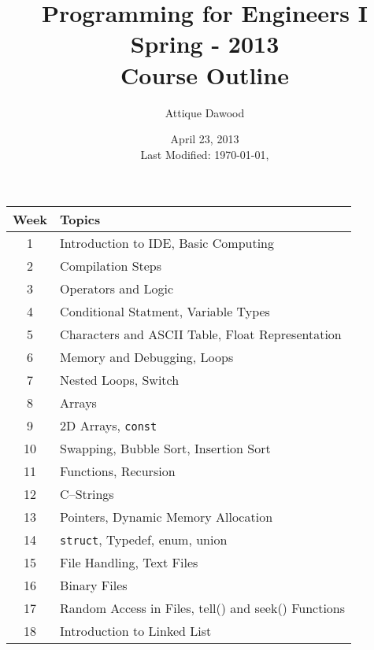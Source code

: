 \documentclass[12pt,a4paper]{article}
\title{\vspace{-2cm}Programming for Engineers I\\Spring - 2013\\Course Outline}
\author{Attique Dawood}
\date{April 23, 2013\\[0.2cm] Last Modified: \today, \currenttime}
\begin{document}
\maketitle
\begin{table}[H]
\begin{center}
\vspace{-0.3cm}
	\begin{tabular}{|c|p{10cm}|}
	\hline \hline
		\rule{0pt}{2.6ex} \textbf{Week} & \textbf{Topics}\\
		\hline
		1 \rule{0pt}{2.6ex} & Introduction to IDE, Basic Computing\\
		2 & Compilation Steps\\
		3 & Operators and Logic\\
		4 & Conditional Statment, Variable Types\\
		5 & Characters and ASCII Table, Float Representation\\
		6 & Memory and Debugging, Loops\\
		7 & Nested Loops, Switch\\
		8 & Arrays\\
		9 & 2D Arrays, \texttt{const}\\
		10 & Swapping, Bubble Sort, Insertion Sort\\
		11 & Functions, Recursion\\
		12 & C--Strings\\
		13 & Pointers, Dynamic Memory Allocation\\
		14 & \texttt{struct}, Typedef, enum, union\\
		15 & File Handling, Text Files\\
		16 & Binary Files\\
		17 & Random Access in Files, tell() and seek() Functions\\
		18 & Introduction to Linked List\\
	\hline \hline
	\end{tabular}
\end{center}
\label{Programming-I-Course-Outline}
\end{table}
\end{document}
